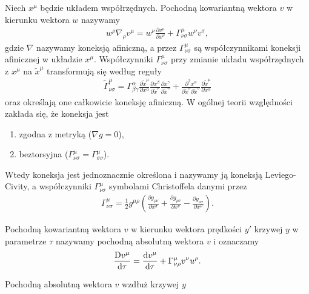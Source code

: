 \begin{definition}
Niech $x^\mu$ będzie układem współrzędnych. 
Pochodną kowariantną wektora $v$ w kierunku wektora $w$ nazywamy
\begin{align*}
w^\rho \nabla_\rho v^\mu = w^\nu \frac{\partial v^\mu}{\partial x^\nu}
+ \Gamma^\mu_{\nu\sigma} w^\nu v^\sigma ,
\end{align*}
gdzie $\nabla$ nazywamy koneksją afiniczną, a przez $\Gamma^\mu_{\nu\sigma} $
są współczynnikami koneksji afinicznej w układzie $x^\mu$. 
Współczynniki $\Gamma^\mu_{\nu\sigma}$ przy zmianie układu współrzędnych z $x^\mu$
na $\tilde{x}^\mu$
transformują się według reguły
\begin{align*}
\tilde{\Gamma}^\mu_{\nu\sigma} = \Gamma^\alpha_{\beta\gamma}
\frac{\partial \tilde{x}^\mu}{\partial x^\alpha }
\frac{\partial x^\beta}{\partial \tilde{x}^\nu }
\frac{\partial x^\gamma}{\partial \tilde{x}^\sigma }
+
\frac{\partial^2 x^\alpha}{\partial \tilde{x}^\nu \partial \tilde{x}^\sigma }
\frac{\partial \tilde{x}^\mu}{\partial x^\alpha }
\end{align*} 
oraz określają one całkowicie koneksję afiniczną.
W ogólnej teorii względności 
zakłada się, że koneksja jest
\begin{enumerate}
    \item zgodna z metryką ($\nabla g =0$),
    \item beztorsyjna ($\Gamma^\mu_{\nu\sigma} 
        = \Gamma^\mu_{\sigma\nu}$).
\end{enumerate} 
Wtedy koneksja jest jednoznacznie określona i nazywamy ją
 koneksją Leviego-Civity, a współczynniki 
$\Gamma^\mu_{\nu\sigma}$ symbolami Christoffela danymi przez
\begin{align*}
\Gamma^\mu_{\nu\sigma} = \frac{1}{2} g^{\mu\rho} 
\left(\frac{\partial g_{\rho\nu}}{\partial x^\sigma}+ 
\frac{\partial g_{\rho\sigma}}{\partial x^\nu}-
\frac{\partial g_{\nu\sigma}}{\partial x^\rho}\right).
\end{align*}
\end{definition}
\begin{definition}
Pochodną kowariantną wektora $v$ w kierunku wektora prędkości
$y'$ krzywej $y$ w parametrze $\tau$ nazywamy
pochodną absolutną wektora $v$ i oznaczamy 
\begin{align*}
\frac{\text{D} v^\mu }{\text{d} \tau } = \frac{\text{d} v^\mu}{\text{d} \tau}
+ \Gamma^\mu_{\nu\rho} v^\nu u^\rho.
\end{align*}
\end{definition}\noindent
Pochodną absolutną wektora $v$ wzdłuż krzywej $y$
